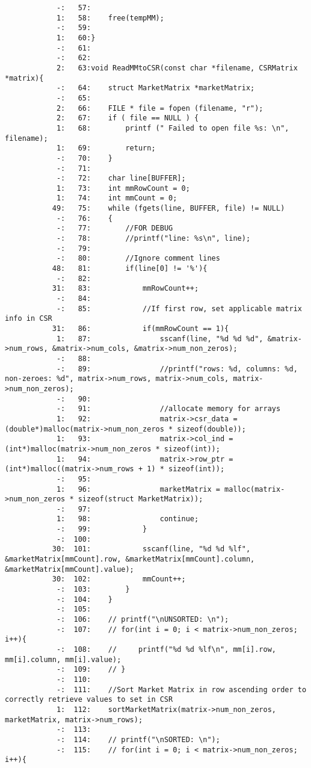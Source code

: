 \documentclass[12pt]{article}
\begin{document}
\begin{mdframed}[style=myboxstyleTerminal1]
\begin{verbatim}
			-:   57:
			1:   58:    free(tempMM); 
			-:   59:    
			1:   60:}
			-:   61:
			-:   62:
			2:   63:void ReadMMtoCSR(const char *filename, CSRMatrix *matrix){
			-:   64:    struct MarketMatrix *marketMatrix;
			-:   65:    
			2:   66:    FILE * file = fopen (filename, "r");
			2:   67:    if ( file == NULL ) {
			1:   68:        printf (" Failed to open file %s: \n", filename);
			1:   69:        return;
			-:   70:    } 
			-:   71:
			-:   72:    char line[BUFFER];
			1:   73:    int mmRowCount = 0;
			1:   74:    int mmCount = 0;
		   49:   75:    while (fgets(line, BUFFER, file) != NULL)
			-:   76:    {   
			-:   77:        //FOR DEBUG
			-:   78:        //printf("line: %s\n", line);
			-:   79:        
			-:   80:        //Ignore comment lines
		   48:   81:        if(line[0] != '%'){
			-:   82:            
		   31:   83:            mmRowCount++;
			-:   84:            
			-:   85:            //If first row, set applicable matrix info in CSR
		   31:   86:            if(mmRowCount == 1){
			1:   87:                sscanf(line, "%d %d %d", &matrix->num_rows, &matrix->num_cols, &matrix->num_non_zeros);
			-:   88:
			-:   89:                //printf("rows: %d, columns: %d, non-zeroes: %d", matrix->num_rows, matrix->num_cols, matrix->num_non_zeros);
			-:   90:
			-:   91:                //allocate memory for arrays
			1:   92:                matrix->csr_data = (double*)malloc(matrix->num_non_zeros * sizeof(double));
			1:   93:                matrix->col_ind = (int*)malloc(matrix->num_non_zeros * sizeof(int));
			1:   94:                matrix->row_ptr = (int*)malloc((matrix->num_rows + 1) * sizeof(int));
			-:   95:                
			1:   96:                marketMatrix = malloc(matrix->num_non_zeros * sizeof(struct MarketMatrix));
			-:   97:
			1:   98:                continue;
			-:   99:            }
			-:  100:                        
		   30:  101:            sscanf(line, "%d %d %lf", &marketMatrix[mmCount].row, &marketMatrix[mmCount].column, &marketMatrix[mmCount].value);
		   30:  102:            mmCount++;
			-:  103:        }
			-:  104:    }
			-:  105:
			-:  106:    // printf("\nUNSORTED: \n");
			-:  107:    // for(int i = 0; i < matrix->num_non_zeros; i++){
			-:  108:    //     printf("%d %d %lf\n", mm[i].row, mm[i].column, mm[i].value);
			-:  109:    // }
			-:  110:    
			-:  111:    //Sort Market Matrix in row ascending order to correctly retrieve values to set in CSR
			1:  112:    sortMarketMatrix(matrix->num_non_zeros, marketMatrix, matrix->num_rows); 
			-:  113:
			-:  114:    // printf("\nSORTED: \n");
			-:  115:    // for(int i = 0; i < matrix->num_non_zeros; i++){

\end{verbatim}
\end{mdframed}
\end{document}
